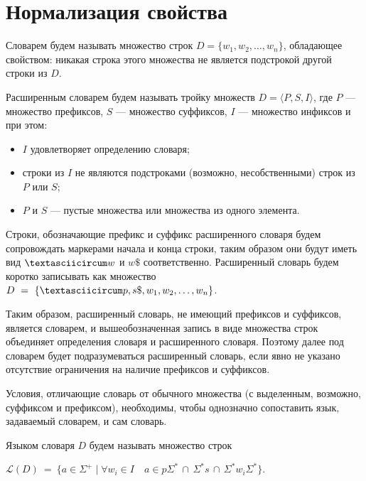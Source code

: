 \documentclass[fontsize=14pt]{scrartcl}
\newcommand{\Lang}{\mathcal{L}}
\begin{document}
\section{Нормализация свойства}

\begin{Definition}
  Словарем будем называть множество строк $D = \{w_1, w_2, \ldots, w_n\}$, обладающее 
  свойством: никакая строка этого множества не является подстрокой другой строки из $D$.
  \end{Definition}
  
  \begin{Definition}
    \label{def:extdict}
  Расширенным словарем будем называть тройку множеств $D = \langle P, S, I \rangle$, 
  где $P$ --- множество префиксов, $S$ --- множество суффиксов, $I$ --- множество инфиксов и при этом:
  \begin{itemize}
      \item $I$ удовлетворяет определению словаря;
      \item строки из $I$ не являются подстроками (возможно, несобственными) строк из $P$ или $S$;
      \item $P$ и $S$ --- пустые множества или множества из одного элемента.
  \end{itemize}
  
  Строки, обозначающие префикс и суффикс расширенного словаря будем сопровождать 
  маркерами начала и конца строки, таким образом они будут иметь вид $\textasciicircum w$ и $w \$$ соответственно.
  Расширенный словарь будем коротко записывать как множество $D~=~\{\textasciicircum p, s \$, w_1, w_2, \ldots, w_n\}$.
  \end{Definition}
  
  Таким образом, расширенный словарь, не имеющий префиксов и суффиксов, является словарем, и вышеобозначенная запись в виде 
  множества строк объединяет определения словаря и расширенного словаря. Поэтому далее под словарем будет
  подразумеваться расширенный словарь, если явно не указано отсутствие ограничения на наличие префиксов и суффиксов.
  
  Условия, отличающие словарь от обычного множества (с выделенным, возможно, суффиксом и префиксом), необходимы,
  чтобы однозначно сопоставить язык, задаваемый словарем, и сам словарь.
  
  \begin{Definition}
  Языком словаря $D$ будем называть множество строк 
  
  $\Lang(D)~=~\{a \in \Sigma^+ \;|\; \forall w_i \in I  \quad a \in p\Sigma^* \, \cap \, \Sigma^*s \, \cap \, \Sigma^*w_i\Sigma^* \}$.
  \end{Definition}
\end{document}
